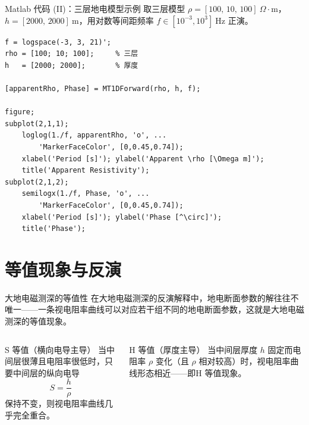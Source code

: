 \documentclass[10pt,aspectratio=169,fontset=none]{ctexbeamer}
\begin{document}
    \begin{frame}[fragile]{Matlab 代码 (II)：三层地电模型示例}
        取三层模型 $\rho=[100,\,10,\,100]\ \Omega\cdot\mathrm{m}$，$h=[2000,\,2000]\ \mathrm{m}$，用对数等间距频率 $f\in[10^{-3},10^3]\ \mathrm{Hz}$ 正演。
        \begin{verbatim}
f = logspace(-3, 3, 21)';
rho = [100; 10; 100];     % 三层
h   = [2000; 2000];       % 厚度

[apparentRho, Phase] = MT1DForward(rho, h, f);

figure;
subplot(2,1,1);
    loglog(1./f, apparentRho, 'o', ...
        'MarkerFaceColor', [0,0.45,0.74]);
    xlabel('Period [s]'); ylabel('Apparent \rho [\Omega m]');
    title('Apparent Resistivity');
subplot(2,1,2);
    semilogx(1./f, Phase, 'o', ...
        'MarkerFaceColor', [0,0.45,0.74]);
    xlabel('Period [s]'); ylabel('Phase [^\circ]');
    title('Phase');
        \end{verbatim}
    \end{frame}

    \section{等值现象与反演}

    \begin{frame}{大地电磁测深的等值性}
        在大地电磁测深的反演解释中，地电断面参数的解往往不唯一——一条视电阻率曲线可以对应若干组不同的地电断面参数，这就是大地电磁测深的\alert{等值现象}。
        \vspace{0.2em}
        \begin{columns}
            \begin{tblock}{S 等值（横向电导主导）}
                当中间层很薄且电阻率很低时，只要中间层的\alert{纵向电导}
                \begin{equation*}
                    S = \frac{h}{\rho}
                \end{equation*}
                保持不变，则视电阻率曲线几乎完全重合。
            \end{tblock}

            \begin{tblock}{H 等值（厚度主导）}
                当中间层厚度 $h$ 固定而电阻率 $\rho$ 变化（且 $\rho$ 相对较高）时，视电阻率曲线形态相近——即\alert{H 等值}现象。
            \end{tblock}
        \end{columns}
    \end{frame}
\end{document}
